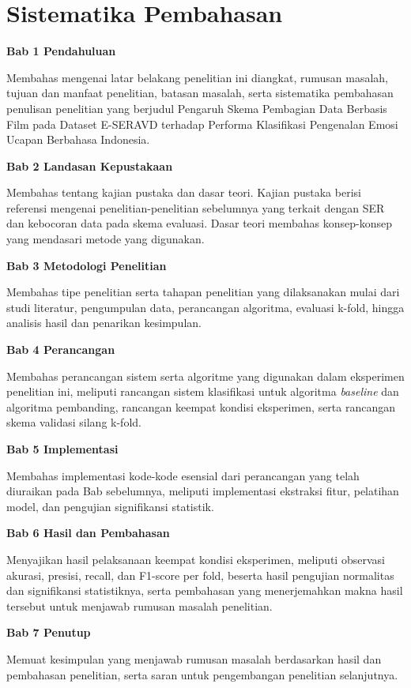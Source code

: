 \section{Sistematika Pembahasan}
\label{sec:1.6}

\textbf{Bab 1 Pendahuluan}

Membahas mengenai latar belakang penelitian
ini diangkat, rumusan masalah, tujuan dan manfaat penelitian, batasan
masalah, serta sistematika pembahasan penulisan penelitian yang
berjudul Pengaruh Skema Pembagian Data Berbasis Film pada Dataset E-SERAVD terhadap Performa Klasifikasi
Pengenalan Emosi Ucapan Berbahasa Indonesia.

\textbf{Bab 2 Landasan Kepustakaan}

Membahas tentang kajian pustaka dan
dasar teori. Kajian pustaka berisi referensi mengenai
penelitian-penelitian sebelumnya yang terkait dengan SER dan kebocoran
data pada skema evaluasi. Dasar teori membahas konsep-konsep yang
mendasari metode yang digunakan.

\textbf{Bab 3 Metodologi Penelitian}

Membahas tipe penelitian serta
tahapan penelitian yang dilaksanakan mulai dari studi literatur,
pengumpulan data, perancangan algoritma, evaluasi k-fold, hingga
analisis hasil dan penarikan kesimpulan.

\textbf{Bab 4 Perancangan}

Membahas perancangan sistem serta algoritme
yang digunakan dalam eksperimen penelitian ini, meliputi rancangan
sistem klasifikasi untuk algoritma \emph{baseline} dan algoritma pembanding,
rancangan keempat kondisi eksperimen, serta rancangan skema
validasi silang k-fold.

\textbf{Bab 5 Implementasi}

Membahas implementasi kode-kode esensial
dari perancangan yang telah diuraikan pada Bab sebelumnya, meliputi implementasi
ekstraksi fitur, pelatihan model, dan pengujian signifikansi statistik.

\textbf{Bab 6 Hasil dan Pembahasan}

Menyajikan hasil pelaksanaan keempat
kondisi eksperimen, meliputi observasi akurasi, presisi, recall, dan
F1-score per fold, beserta hasil pengujian normalitas dan signifikansi
statistiknya, serta pembahasan yang menerjemahkan makna hasil tersebut
untuk menjawab rumusan masalah penelitian.

\textbf{Bab 7 Penutup}

Memuat kesimpulan yang menjawab rumusan masalah
berdasarkan hasil dan pembahasan penelitian, serta saran untuk
pengembangan penelitian selanjutnya.

